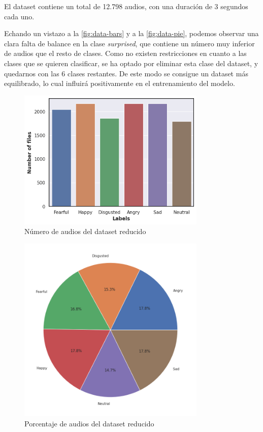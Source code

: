 El dataset contiene un total de 12.798 audios, con una duración de 3 segundos cada uno.

Echando un vistazo a la \autoref{fig:data-bars} y a la \autoref{fig:data-pie}, podemos observar una clara falta de balance en la clase \textit{surprised}, que contiene un número muy inferior de audios que el resto de clases.
Como no existen restricciones en cuanto a las clases que se quieren clasificar, se ha optado por eliminar esta clase del dataset, y quedarnos con las 6 clases restantes.
De este modo se consigue un dataset más equilibrado, lo cual influirá positivamente en el entrenamiento del modelo.

\begin{figure}[htpb]
    \centering
    \includegraphics[width=0.8\textwidth]{cap2/images/dataset-bars-small.png}
    \caption{Número de audios del dataset reducido}
    \label{fig:data-bars-small}
\end{figure}

\begin{figure}[htpb]
    \centering
    \includegraphics[width=0.8\textwidth]{cap2/images/dataset-pie-small.png}
    \caption{Porcentaje de audios del dataset reducido}
    \label{fig:data-pie-small}
\end{figure}

